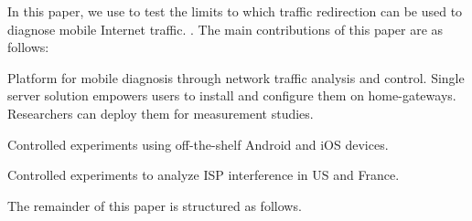 In this paper, we use \meddle to test the limits to which traffic redirection can be used to diagnose mobile Internet traffic. . 
The main contributions of this paper are as follows:
\begin{packedenumerate}
\item Platform for mobile diagnosis through network traffic analysis and control. Single server solution empowers users to install and configure them on home-gateways.
Researchers can deploy them for measurement studies. 
\item Controlled experiments using off-the-shelf Android and iOS devices. 
\item Controlled experiments to analyze ISP interference in US and France. 
\end{packedenumerate}

The remainder of this paper is structured as follows.


